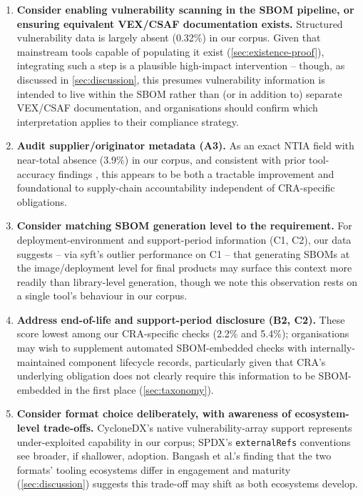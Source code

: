 \documentclass[11pt]{article}
\begin{document}
\begin{enumerate}
\item \textbf{Consider enabling vulnerability scanning in the SBOM pipeline, or ensuring equivalent VEX/CSAF documentation exists.} Structured vulnerability data is largely absent (0.32\%) in our corpus. Given that mainstream tools capable of populating it exist (\cref{sec:existence-proof}), integrating such a step is a plausible high-impact intervention -- though, as discussed in \cref{sec:discussion}, this presumes vulnerability information is intended to live within the SBOM rather than (or in addition to) separate VEX/CSAF documentation, and organisations should confirm which interpretation applies to their compliance strategy.
\item \textbf{Audit supplier/originator metadata (A3).} As an exact NTIA field with near-total absence (3.9\%) in our corpus, and consistent with prior tool-accuracy findings \cite{muneza2025,halbritter2024}, this appears to be both a tractable improvement and foundational to supply-chain accountability independent of CRA-specific obligations.
\item \textbf{Consider matching SBOM generation level to the requirement.} For deployment-environment and support-period information (C1, C2), our data suggests -- via syft's outlier performance on C1 -- that generating SBOMs at the image/deployment level for final products may surface this context more readily than library-level generation, though we note this observation rests on a single tool's behaviour in our corpus.
\item \textbf{Address end-of-life and support-period disclosure (B2, C2).} These score lowest among our CRA-specific checks (2.2\% and 5.4\%); organisations may wish to supplement automated SBOM-embedded checks with internally-maintained component lifecycle records, particularly given that CRA's underlying obligation does not clearly require this information to be SBOM-embedded in the first place (\cref{sec:taxonomy}).
\item \textbf{Consider format choice deliberately, with awareness of ecosystem-level trade-offs.} CycloneDX's native vulnerability-array support represents under-exploited capability in our corpus; SPDX's \texttt{externalRefs} conventions see broader, if shallower, adoption. Bangash et al.'s \cite{bangash2026} finding that the two formats' tooling ecosystems differ in engagement and maturity (\cref{sec:discussion}) suggests this trade-off may shift as both ecosystems develop.
\end{enumerate}
\end{document}
